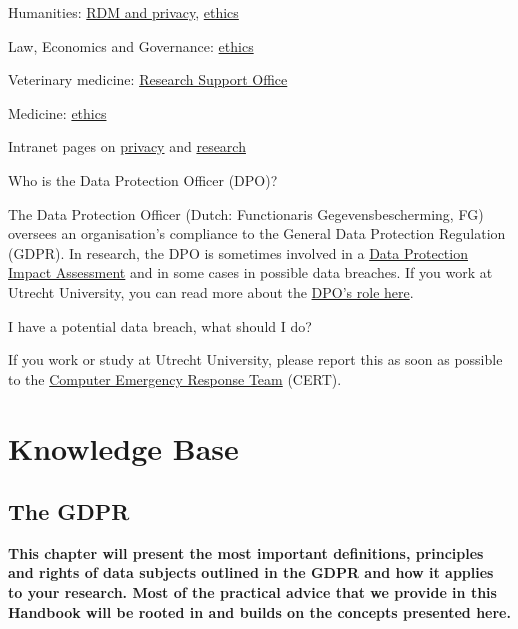 \documentclass[
]{book}
\begin{document}
Humanities: \href{https://cdh.uu.nl/research/data-management-privacy/}{RDM and privacy}, \href{https://fetc-gw.wp.hum.uu.nl/}{ethics}

Law, Economics and Governance: \href{https://intranet.uu.nl/en/knowledgebase/facultys-ethical-review-committee}{ethics}

Veterinary medicine: \href{https://www.uu.nl/en/node/589/onderzoeksbureauresearch-support-office}{Research Support Office}

Medicine: \href{https://www.metc-utrecht.nl/en/}{ethics}

Intranet pages on \href{https://intranet.uu.nl/en/knowledge-base/privacy-at-uu}{privacy} and \href{https://intranet.uu.nl/en/knowledgebase/research}{research}

Who is the Data Protection Officer (DPO)?

The Data Protection Officer (Dutch: Functionaris Gegevensbescherming, FG) oversees an organisation's compliance to the General Data Protection Regulation (GDPR). In research, the DPO is sometimes involved in a \protect\hyperlink{dpia}{Data Protection Impact Assessment} and in some cases in possible data breaches. If you work at Utrecht University, you can read more about the \href{https://intranet.uu.nl/en/knowledgebase/data-protection-officer}{DPO's role here}.

I have a potential data breach, what should I do?

If you work or study at Utrecht University, please report this as soon as possible to the \href{https://intranet.uu.nl/en/security/information-security-computer-misuse-or-report-incident-cert}{Computer Emergency Response Team} (CERT).

\hypertarget{part-knowledge-base}{%
\part*{Knowledge Base}\label{part-knowledge-base}}

\hypertarget{gdpr}{%
\chapter*{The GDPR}\label{gdpr}}

\textbf{This chapter will present the most important definitions, principles and rights
of data subjects outlined in the GDPR and how it applies to your research. Most
of the practical advice that we provide in this Handbook will be rooted in and
builds on the concepts presented here.}
\end{document}
